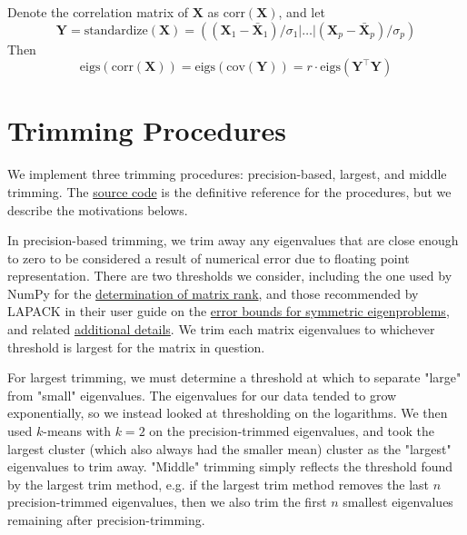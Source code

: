 \documentclass[12pt]{spieman}  %
\begin{document}
\begin{spacing}{2}
Denote the correlation matrix of \(\mathbf{X}\) as \(\text{corr}(\mathbf{X})\),
and let
\[
\mathbf{Y} = \text{standardize}(\mathbf{X}) =
\left(
(\mathbf{X}_1 - \bar{\mathbf{X}}_1) / \sigma_1 | \dots | (\mathbf{X}_p - \bar{\mathbf{X}}_p) / \sigma_p
\right)
\]
Then
\[
\text{eigs}\left( \text{corr}(\mathbf{X})  \right)
= \text{eigs}\left( \text{cov}(\mathbf{Y})  \right)
= r \cdot \text{eigs}(\mathbf{Y}^{\top}\mathbf{Y})
\]

\section{Trimming Procedures}
\label{sec:trimming}

We implement three trimming procedures: precision-based, largest, and middle
trimming. The
\href{https://github.com/DM-Berger/random-matrix-fmri/blob/7c9e4187f582dedee728cd7193b8894d928c2f00/code/rmt/updated_dataset.py#L431-L444}{source
code} is the definitive reference for the procedures, but we describe the
motivations belows.

In precision-based trimming, we trim away any eigenvalues that are close enough
to zero to be considered a result of numerical error due to floating point
representation. There are two thresholds we consider, including the one used by
NumPy\cite{harrisArrayProgrammingNumPy2020} for the
\href{https://numpy.org/doc/stable/reference/generated/numpy.linalg.matrix_rank.html}{determination
of matrix rank}, and those recommended by LAPACK\cite{laug} in their user
guide\cite{andersonLAPACKUsersGuide1999a} on the
\href{https://netlib.org/lapack/lug/node89.html}{error bounds for symmetric
eigenproblems}, and related
\href{https://netlib.org/lapack/lug/node90.html}{additional details}. We trim
each matrix eigenvalues to whichever threshold is largest for the matrix in
question.

For largest trimming, we must determine a threshold at which to separate
"large" from "small" eigenvalues. The eigenvalues for our data tended to grow
exponentially, so we instead looked at thresholding on the logarithms. We then
used \(k\)-means with \(k=2\) on the precision-trimmed eigenvalues, and took
the largest cluster (which also always had the smaller mean) cluster as the
"largest" eigenvalues to trim away. "Middle" trimming simply reflects the
threshold found by the largest trim method, e.g. if the largest trim method
removes the last \(n\) precision-trimmed eigenvalues, then we also trim the
first \(n\) smallest eigenvalues remaining after precision-trimming.


\end{spacing}
\end{document}
